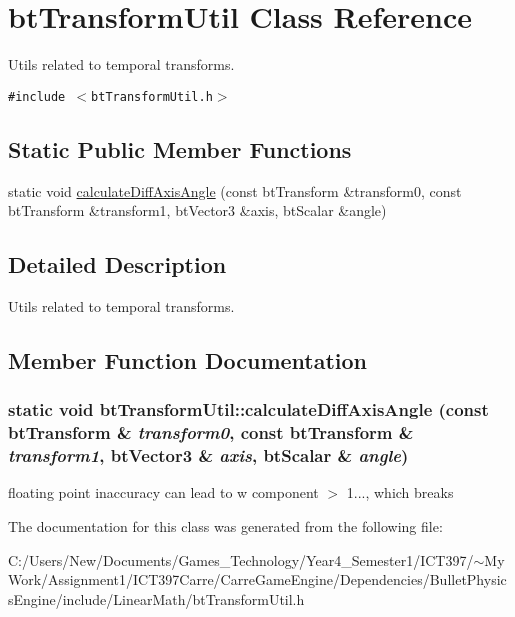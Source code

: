 \hypertarget{classbt_transform_util}{
\section{btTransformUtil Class Reference}
\label{classbt_transform_util}
}
Utils related to temporal transforms.  


{\tt \#include $<$btTransformUtil.h$>$}

\subsection*{Static Public Member Functions}
\begin{CompactItemize}
\item 
static void \hyperlink{classbt_transform_util_39f53b05940a57082053067bd5e337ec}{calculateDiffAxisAngle} (const btTransform \&transform0, const btTransform \&transform1, btVector3 \&axis, btScalar \&angle)
\end{CompactItemize}


\subsection{Detailed Description}
Utils related to temporal transforms. 

\subsection{Member Function Documentation}
\hypertarget{classbt_transform_util_39f53b05940a57082053067bd5e337ec}{
\subsubsection[calculateDiffAxisAngle]{\setlength{\rightskip}{0pt plus 5cm}static void btTransformUtil::calculateDiffAxisAngle (const btTransform \& {\em transform0}, \/  const btTransform \& {\em transform1}, \/  btVector3 \& {\em axis}, \/  btScalar \& {\em angle})}}
\label{classbt_transform_util_39f53b05940a57082053067bd5e337ec}




floating point inaccuracy can lead to w component $>$ 1..., which breaks 

The documentation for this class was generated from the following file:\begin{CompactItemize}
\item 
C:/Users/New/Documents/Games\_\-Technology/Year4\_\-Semester1/ICT397/$\sim$My Work/Assignment1/ICT397Carre/CarreGameEngine/Dependencies/BulletPhysicsEngine/include/LinearMath/btTransformUtil.h\end{CompactItemize}
